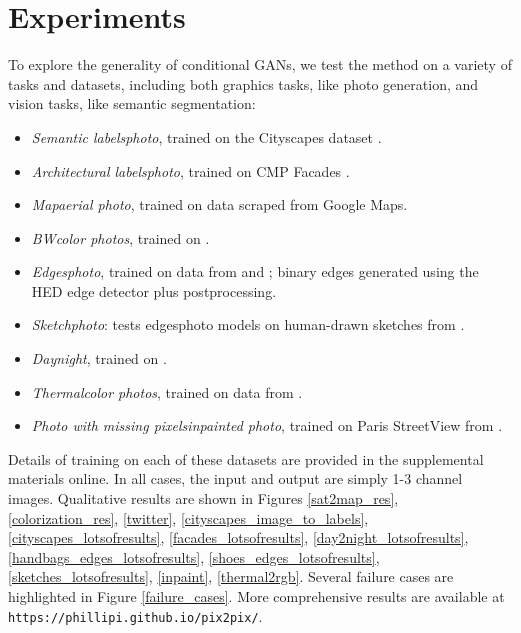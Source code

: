 \documentclass[10pt,twocolumn,letterpaper]{article}
\begin{document}
\section{Experiments}

To explore the generality of conditional GANs, we test the method on a variety of tasks and datasets, including both graphics tasks, like photo generation, and vision tasks, like semantic segmentation:

\begin{itemize}
\itemsep-0.05in
\item \emph{Semantic labelsphoto}, trained on the Cityscapes dataset \cite{Cordts2016Cityscapes}.
\item \emph{Architectural labelsphoto}, trained on CMP Facades \cite{Tylecek13}.
\item \emph{Mapaerial photo}, trained on data scraped from Google Maps.
\item \emph{BWcolor photos}, trained on \cite{russakovsky2015imagenet}.
\item \emph{Edgesphoto}, trained on data from \cite{zhu2016generative} and \cite{finegrained_shoes}; binary edges generated using the HED edge detector \cite{xie2015holistically} plus postprocessing.
\item \emph{Sketchphoto}: tests edgesphoto models on human-drawn sketches from \cite{eitz2012humans}.
\item \emph{Daynight}, trained on \cite{laffont2014transient}.
\item \emph{Thermalcolor photos}, trained on data from \cite{hwang2015multispectral}.
\item \emph{Photo with missing pixelsinpainted photo}, trained on Paris StreetView from \cite{doersch2012makes}.
\end{itemize}

Details of training on each of these datasets are provided in the supplemental materials online. In all cases, the input and output are simply 1-3 channel images. Qualitative results are shown in Figures \ref{sat2map_res}, \ref{colorization_res}, \ref{twitter}, \ref{cityscapes_image_to_labels}, \ref{cityscapes_lotsofresults}, \ref{facades_lotsofresults},
\ref{day2night_lotsofresults}, \ref{handbags_edges_lotsofresults}, \ref{shoes_edges_lotsofresults}, \ref{sketches_lotsofresults}, \ref{inpaint}, \ref{thermal2rgb}. Several failure cases are highlighted in Figure \ref{failure_cases}. More comprehensive results are available at \texttt{https://phillipi.github.io/pix2pix/}.
\end{document}
